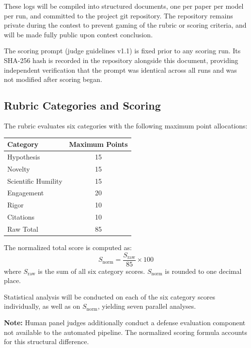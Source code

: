 \documentclass[11pt]{article}
\begin{document}
These logs will be compiled into structured documents, one per paper per model per run, and committed to the project git repository. The repository remains private during the contest to prevent gaming of the rubric or scoring criteria, and will be made fully public upon contest conclusion.

The scoring prompt (judge guidelines v1.1) is fixed prior to any scoring run. Its SHA-256 hash is recorded in the repository alongside this document, providing independent verification that the prompt was identical across all runs and was not modified after scoring began.

\subsection{Rubric Categories and Scoring}

The rubric evaluates six categories with the following maximum point allocations:

\begin{center}
\begin{tabular}{lc}
\toprule
\textbf{Category} & \textbf{Maximum Points} \\
\midrule
Hypothesis & 15 \\
Novelty & 15 \\
Scientific Humility & 15 \\
Engagement & 20 \\
Rigor & 10 \\
Citations & 10 \\
\midrule
Raw Total & 85 \\
\bottomrule
\end{tabular}
\end{center}

The normalized total score is computed as:
\begin{equation}
S_{\text{norm}} = \frac{S_{\text{raw}}}{85} \times 100
\end{equation}
where $S_{\text{raw}}$ is the sum of all six category scores. $S_{\text{norm}}$ is rounded to one decimal place.

Statistical analysis will be conducted on each of the six category scores individually, as well as on $S_{\text{norm}}$, yielding seven parallel analyses.

\textbf{Note:} Human panel judges additionally conduct a defense evaluation component not available to the automated pipeline. The normalized scoring formula accounts for this structural difference.
\end{document}
